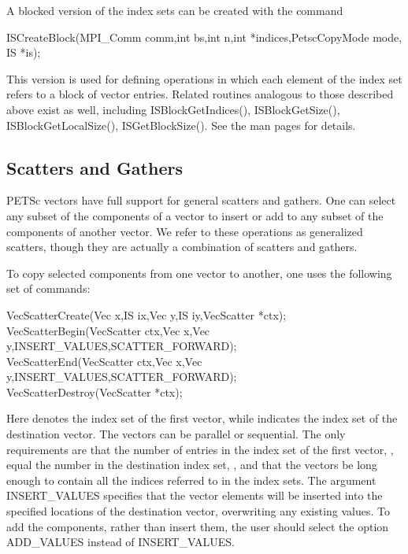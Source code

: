 A blocked version of the index sets can be created with the command
\begin{tabbing}
  ISCreateBlock(MPI\_Comm comm,int bs,int n,int *indices,PetscCopyMode mode, IS *is);
\end{tabbing}
This version is used for defining operations in which each element of the index
set refers to a block of  vector entries.  Related routines analogous
to those described above exist as well, including
ISBlockGetIndices(), ISBlockGetSize(), ISBlockGetLocalSize(), ISGetBlockSize().
See the man pages for details.

\subsection{Scatters and Gathers}  
\label{sec_scatter}

PETSc vectors have full support for general scatters and
gathers. One can select any subset of the components of a vector to
insert or add to any subset of the components of another vector.
We refer to these operations as generalized scatters, though they are
actually a combination of scatters and gathers.

 
To copy selected components from one vector
to another, one uses the following set of commands:
\begin{tabbing}
  VecScatterCreate(Vec x,IS ix,Vec y,IS iy,VecScatter *ctx);\\
  VecScatterBegin(VecScatter ctx,Vec x,Vec y,INSERT\_VALUES,SCATTER\_FORWARD);\\
  VecScatterEnd(VecScatter ctx,Vec x,Vec y,INSERT\_VALUES,SCATTER\_FORWARD);\\
  VecScatterDestroy(VecScatter *ctx);
\end{tabbing}
Here  denotes the index set of the first vector, while  indicates the index set of the destination vector.  The vectors
can be parallel or sequential. The only requirements are that the
number of entries in the index set of the first vector, ,
equal the number in the destination index set, , and that the
vectors be long enough to contain all the indices referred to in the
index sets.  The argument INSERT\_VALUES specifies that the
vector elements will be inserted into the specified locations of the
destination vector, overwriting any existing values.  To add the
components, rather than insert them, the user should select the option
ADD\_VALUES instead of INSERT\_VALUES.

